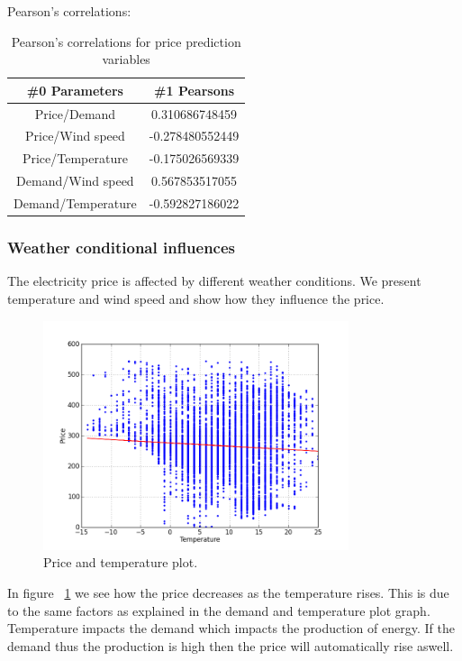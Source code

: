 Pearson's correlations:
\begin{table}[!ht]
\centering  %
\begin{tabular}{c c} %
 \#0 Parameters & \#1 Pearsons \\ [0.5ex] %
\hline                  %
Price/Demand & 0.310686748459 \\
Price/Wind speed & -0.278480552449  \\
Price/Temperature & -0.175026569339 \\
Demand/Wind speed & 0.567853517055 \\
Demand/Temperature & -0.592827186022 \\
\hline %
\end{tabular}
\caption{Pearson's correlations for price prediction variables} %
\label{table:pearsonsPriceVariables} %
\end{table}

\subsubsection{Weather conditional influences}
The electricity price is affected by different weather conditions. We present temperature and wind speed and show how they influence the price.

\begin{figure}[H]
\centering
\includegraphics[width=0.8\textwidth ,natwidth=410,natheight=237]{billeder/energy_price_plots/price_temp.png}
\caption{Price and temperature plot.}
\label{fig:price_temp}
\end{figure}

In figure ~\ref{fig:price_temp} we see how the price decreases as the temperature rises. This is due to the same factors as explained in the demand and temperature plot graph. Temperature impacts the demand which impacts the production of energy. If the demand thus the production is high then the price will automatically rise aswell.

